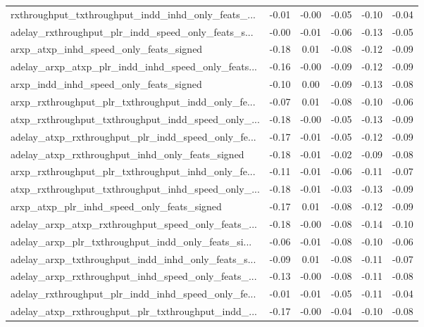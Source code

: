 \begin{tabular}{|l|*{4}{c}|r|}
rxthroughput\_txthroughput\_indd\_inhd\_only\_feats\_... & -0.01 & -0.00 &   -0.05 &      -0.10 & -0.04 \\
adelay\_rxthroughput\_plr\_indd\_speed\_only\_feats\_s... & -0.00 & -0.01 &   -0.06 &      -0.13 & -0.05 \\
arxp\_atxp\_inhd\_speed\_only\_feats\_signed             & -0.18 &  0.01 &   -0.08 &      -0.12 & -0.09 \\
adelay\_arxp\_atxp\_plr\_indd\_inhd\_speed\_only\_feats... & -0.16 & -0.00 &   -0.09 &      -0.12 & -0.09 \\
arxp\_indd\_inhd\_speed\_only\_feats\_signed             & -0.10 &  0.00 &   -0.09 &      -0.13 & -0.08 \\
arxp\_rxthroughput\_plr\_txthroughput\_indd\_only\_fe... & -0.07 &  0.01 &   -0.08 &      -0.10 & -0.06 \\
atxp\_rxthroughput\_txthroughput\_indd\_speed\_only\_... & -0.18 & -0.00 &   -0.05 &      -0.13 & -0.09 \\
adelay\_atxp\_rxthroughput\_plr\_indd\_speed\_only\_fe... & -0.17 & -0.01 &   -0.05 &      -0.12 & -0.09 \\
adelay\_atxp\_rxthroughput\_inhd\_only\_feats\_signed    & -0.18 & -0.01 &   -0.02 &      -0.09 & -0.08 \\
arxp\_rxthroughput\_plr\_txthroughput\_inhd\_only\_fe... & -0.11 & -0.01 &   -0.06 &      -0.11 & -0.07 \\
atxp\_rxthroughput\_txthroughput\_inhd\_speed\_only\_... & -0.18 & -0.01 &   -0.03 &      -0.13 & -0.09 \\
arxp\_atxp\_plr\_inhd\_speed\_only\_feats\_signed         & -0.17 &  0.01 &   -0.08 &      -0.12 & -0.09 \\
adelay\_arxp\_atxp\_rxthroughput\_speed\_only\_feats\_... & -0.18 & -0.00 &   -0.08 &      -0.14 & -0.10 \\
adelay\_arxp\_plr\_txthroughput\_indd\_only\_feats\_si... & -0.06 & -0.01 &   -0.08 &      -0.10 & -0.06 \\
adelay\_arxp\_txthroughput\_indd\_inhd\_only\_feats\_s... & -0.09 &  0.01 &   -0.08 &      -0.11 & -0.07 \\
adelay\_arxp\_rxthroughput\_inhd\_speed\_only\_feats\_... & -0.13 & -0.00 &   -0.08 &      -0.11 & -0.08 \\
adelay\_rxthroughput\_plr\_indd\_inhd\_speed\_only\_fe... & -0.01 & -0.01 &   -0.05 &      -0.11 & -0.04 \\
adelay\_atxp\_rxthroughput\_plr\_txthroughput\_indd\_... & -0.17 & -0.00 &   -0.04 &      -0.10 & -0.08 \\

\end{tabular}
